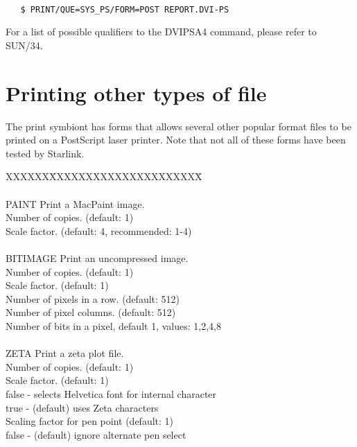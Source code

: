 \begin{verbatim}

   $ PRINT/QUE=SYS_PS/FORM=POST REPORT.DVI-PS

\end{verbatim}

For a list of possible qualifiers to the DVIPSA4 command, please refer to
SUN/34.


\section{Printing other types of file}

The print symbiont has forms that allows several other popular format files to be
printed on a PostScript laser printer. Note that not all of these forms have
been tested by Starlink.

\begin{tabbing}
XXXXXX\=XXXXXXXXXXXXXXXXXXXXX\= \kill
{}            \\
\\
\>PAINT     \>  Print a MacPaint image.\\
            \>   Number of copies. (default: 1)\\
            \>     Scale factor. (default: 4, recommended: 1-4)\\
\\
\>BITIMAGE \>  Print an uncompressed image.\\
       \>  Number of copies. (default: 1)\\
       \>  Scale factor. (default: 1)\\
       \>  Number of pixels in a row. (default: 512)\\
       \>  Number of pixel columns. (default: 512)\\
       \>  Number of bits in a pixel, default 1, values: 1,2,4,8\\
\\
\>ZETA \>  Print a zeta plot file.\\
       \>  Number of copies. (default: 1)\\
       \>  Scale factor. (default: 1)\\
       \>  false - selects Helvetica font for internal character\\
       \>\>         true -  (default) uses Zeta characters\\
       \> Scaling factor for pen point (default: 1)\\
       \>  false - (default) ignore alternate pen select\\
\end{tabbing}


